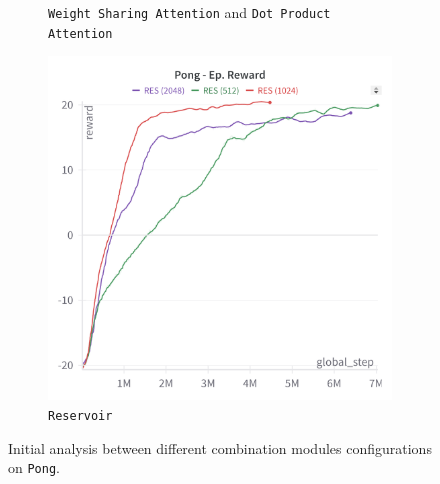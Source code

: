 \begin{figure}[ht]
\begin{subfigure}[b]{0.45\textwidth}
        \caption{\texttt{Weight Sharing Attention} and \texttt{Dot Product Attention}}
        \label{fig:pong_wsa_dpa}
    \end{subfigure}
    \hfill
    \begin{subfigure}[b]{0.45\textwidth}
        \centering
        \includegraphics[width=\textwidth]{images/pong_res.png}
        \caption{\texttt{Reservoir}}
        \label{fig:pong_res}
    \end{subfigure}
    \caption{Initial analysis between different combination modules configurations on \texttt{Pong}.}
    \label{fig:pong_concat_modules}
\end{figure}

